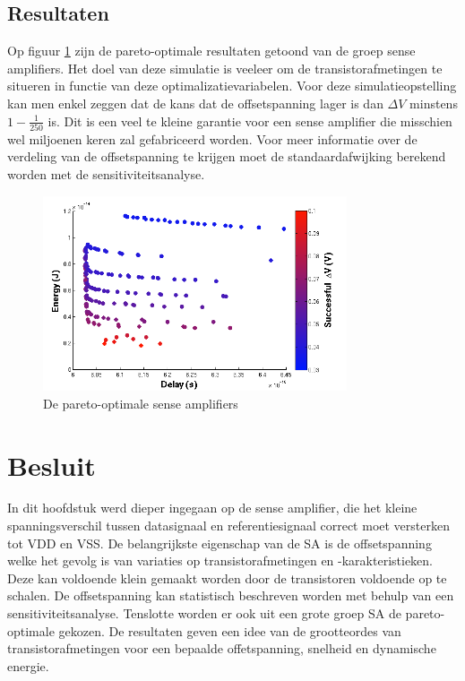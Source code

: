 \subsection{Resultaten}
Op figuur \ref{fig:pareto} zijn de pareto-optimale resultaten getoond van de groep sense amplifiers. Het doel van deze simulatie is veeleer om de transistorafmetingen te situeren in functie van deze optimalizatievariabelen. Voor deze simulatieopstelling kan men enkel zeggen dat de kans dat de offsetspanning lager is dan $\Delta V$ minstens $1 -\frac{1}{250}$ is. Dit is een veel te kleine garantie voor een sense amplifier die misschien wel miljoenen keren zal gefabriceerd worden. Voor meer informatie over de verdeling van de offsetspanning te krijgen moet de standaardafwijking berekend worden met de sensitiviteitsanalyse.

\begin{figure}
  \centering
  \includegraphics[width=0.8\textwidth]{../fig/hfdstk-sensamp-pareto2.png}
  \caption[De pareto-optimale sense amplifiers]{De pareto-optimale sense amplifiers}
  \label{fig:pareto}
\end{figure}

\section{Besluit}
In dit hoofdstuk werd dieper ingegaan op de sense amplifier, die het kleine spanningsverschil tussen datasignaal en referentiesignaal correct moet versterken tot VDD en VSS. De belangrijkste eigenschap van de SA is de offsetspanning welke het gevolg is van variaties op transistorafmetingen en -karakteristieken. Deze kan voldoende klein gemaakt worden door de transistoren voldoende op te schalen. De offsetspanning kan statistisch beschreven worden met behulp van een sensitiviteitsanalyse. Tenslotte worden er ook uit een grote groep SA de pareto-optimale gekozen. De resultaten geven een idee van de grootteordes van transistorafmetingen voor een bepaalde offetspanning, snelheid en dynamische energie.
